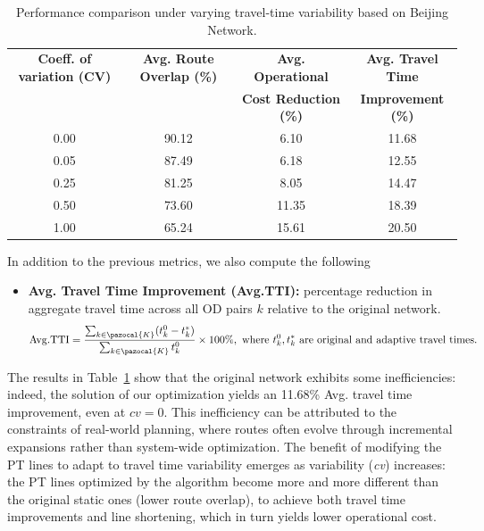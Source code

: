 \documentclass[a4paper,fleqn]{cas-sc}
\begin{document}
\begin{table}[t]
\centering
\small
\begin{threeparttable}
    \setlength{\tabcolsep}{12pt} 
    \renewcommand{\arraystretch}{1.25}

    \begin{tabular}{c c c c}
    \toprule
    \textbf{Coeff. of variation (CV)} & \textbf{Avg. Route Overlap (\%)} & \textbf{Avg. Operational} & \textbf{Avg. Travel Time } 
    \\
    && \textbf{Cost Reduction (\%)} & \textbf{Improvement (\%)}
    \\
    \midrule
    0.00 & 90.12 & 6.10  & 11.68  \\
    0.05 & 87.49 & 6.18  & 12.55  \\
    0.25 & 81.25 & 8.05  & 14.47 \\
    0.50 & 73.60 & 11.35 & 18.39  \\
    1.00 & 65.24 & 15.61 & 20.50 \\
    \bottomrule
    \end{tabular}
    
\end{threeparttable}
\caption{Performance comparison under varying travel-time variability based on Beijing Network.}
\label{tab:routes_comparison}
\end{table}

In addition to the previous metrics, we also compute the following
\begin{itemize}
    \item \textbf{Avg. Travel Time Improvement (Avg.TTI):} percentage reduction in aggregate travel time across all OD pairs $k$ relative to the original network.
    \begin{align}
        \mathrm{Avg. TTI} = \frac{\sum_{k \in \pazocal{K}} (t_k^0 - t_k^*)}{\sum_{k \in \pazocal{K}} t_k^0} \times 100\%, \text{ where } t_k^0, t_k^* \text{ are original and adaptive travel times.}
    \end{align}
\end{itemize}
%
The results in Table~\ref{tab:routes_comparison} show that the original network exhibits some inefficiencies: indeed, the solution of our optimization yields an 11.68\% Avg. travel time improvement, even at $cv = 0$. This inefficiency can be attributed to the constraints of real-world planning, where routes often evolve through incremental expansions rather than system-wide optimization.
%
The benefit of modifying the PT lines to adapt to travel time variability emerges as variability (\textit{cv}) increases: the PT lines optimized by the algorithm become more and more different than the original static ones (lower route overlap), to achieve both travel time improvements and line shortening, which in turn yields lower operational cost.
\end{document}
